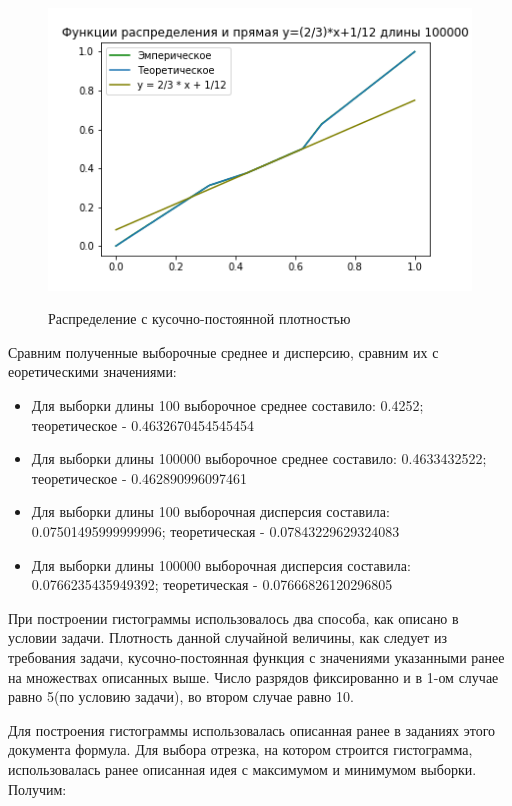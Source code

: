 \documentclass{article}
\begin{document}
\begin{equsation*}
\begin{figure}[h]
{    \includegraphics[scale=0.39]{./Task3/Task_3__distrib_100000.png}
}
\caption{Распределение с кусочно-постоянной плотностью}
\label{fig:image}
\end{figure}

Сравним полученные выборочные среднее и дисперсию, сравним их с еоретическими значениями:
\begin{itemize}
    \item Для выборки длины 100 выборочное среднее составило: 0.4252; теоретическое - 0.4632670454545454
    \item Для выборки длины 100000 выборочное среднее составило: 0.4633432522;
        теоретическое - 0.462890996097461
    \item Для выборки длины 100 выборочная дисперсия составила: 0.07501495999999996;
        теоретическая - 0.07843229629324083
    \item Для выборки длины 100000 выборочная дисперсия составила: 0.0766235435949392;
        теоретическая - 0.07666826120296805
\end{itemize}

При построении гистограммы использовалось два способа, как описано в условии задачи. 
Плотность данной случайной величины, как следует из требования задачи, кусочно-постоянная функция с
значениями указанными ранее на множествах описанных выше. Число разрядов фиксированно и в 1-ом
случае равно 5(по условию задачи), во втором случае равно 10.

Для построения гистограммы использовалась описанная ранее в заданиях этого документа формула.
Для выбора отрезка, на котором строится гистограмма, использовалась ранее описанная идея с
максимумом и минимумом выборки. Получим:


\end{equsation*}
\end{document}
